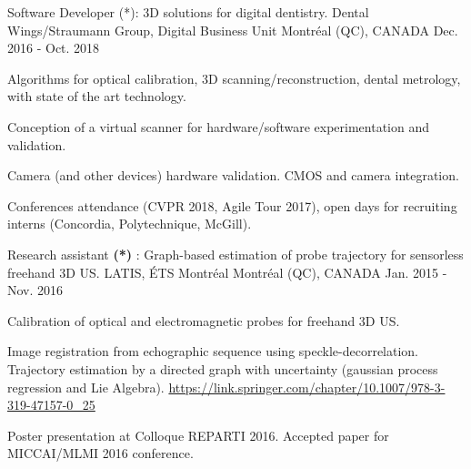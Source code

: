 \begin{cventries}
\cventry
{Software Developer (*): 3D solutions for digital dentistry.}%
{Dental Wings/Straumann Group, Digital Business Unit} %
{\hspace{-5mm}Montréal (QC), CANADA} %
{Dec. 2016 - Oct. 2018} %
{ %
\begin{cvitems}
\item {Algorithms for optical calibration, 3D scanning/reconstruction, dental metrology,  with state of the art technology.}
\item {Conception of a virtual scanner for hardware/software experimentation and validation.}
\item {Camera (and other devices) hardware validation. CMOS and camera integration.}
\item Conferences attendance (CVPR 2018, Agile Tour 2017), open days for recruiting interns (Concordia, Polytechnique, McGill).
\end{cvitems}
}


\cventry
{Research assistant \textbf{(*)} : Graph-based estimation of probe trajectory for sensorless freehand 3D US.}%
{LATIS, ÉTS Montréal} %
{\hspace{-5mm}Montréal (QC), CANADA} %
{Jan. 2015 - Nov. 2016} %
{ %
\begin{cvitems}
\item {Calibration of optical and electromagnetic probes for freehand 3D US.}
\item {Image registration from echographic sequence using speckle-decorrelation. Trajectory estimation by a directed graph with uncertainty (gaussian process regression and Lie Algebra). \url{https://link.springer.com/chapter/10.1007/978-3-319-47157-0_25}}
\item {Poster presentation at Colloque REPARTI 2016. Accepted paper for MICCAI/MLMI 2016 conference.}
\end{cvitems}
}


\end{cventries}
